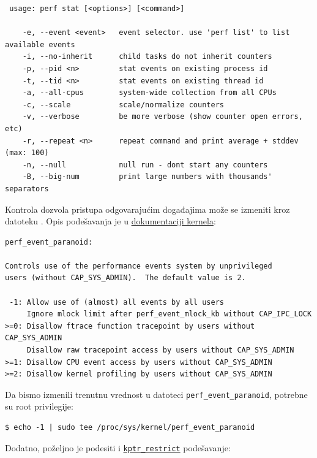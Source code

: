 \begin{verbatim}
 usage: perf stat [<options>] [<command>]

    -e, --event <event>   event selector. use 'perf list' to list available events
    -i, --no-inherit      child tasks do not inherit counters
    -p, --pid <n>         stat events on existing process id
    -t, --tid <n>         stat events on existing thread id
    -a, --all-cpus        system-wide collection from all CPUs
    -c, --scale           scale/normalize counters
    -v, --verbose         be more verbose (show counter open errors, etc)
    -r, --repeat <n>      repeat command and print average + stddev (max: 100)
    -n, --null            null run - dont start any counters
    -B, --big-num         print large numbers with thousands' separators
\end{verbatim}

Kontrola dozvola pristupa odgovarajućim događajima može se izmeniti kroz datoteku . Opis podešavanja je u \href{https://www.kernel.org/doc/Documentation/sysctl/kernel.txt}{dokumentaciji kernela}:

\begin{verbatim}
perf_event_paranoid:

Controls use of the performance events system by unprivileged
users (without CAP_SYS_ADMIN).  The default value is 2.

 -1: Allow use of (almost) all events by all users
     Ignore mlock limit after perf_event_mlock_kb without CAP_IPC_LOCK
>=0: Disallow ftrace function tracepoint by users without CAP_SYS_ADMIN
     Disallow raw tracepoint access by users without CAP_SYS_ADMIN
>=1: Disallow CPU event access by users without CAP_SYS_ADMIN
>=2: Disallow kernel profiling by users without CAP_SYS_ADMIN
\end{verbatim}

Da bismo izmenili trenutnu vrednost u datoteci \texttt{perf\_event\_paranoid}, potrebne su root privilegije:

\begin{verbatim}
$ echo -1 | sudo tee /proc/sys/kernel/perf_event_paranoid
\end{verbatim}

Dodatno, poželjno je podesiti i \href{https://docs.kernel.org/admin-guide/sysctl/kernel.html\#kptr-restrict}{\texttt{kptr\_restrict}} podešavanje:

